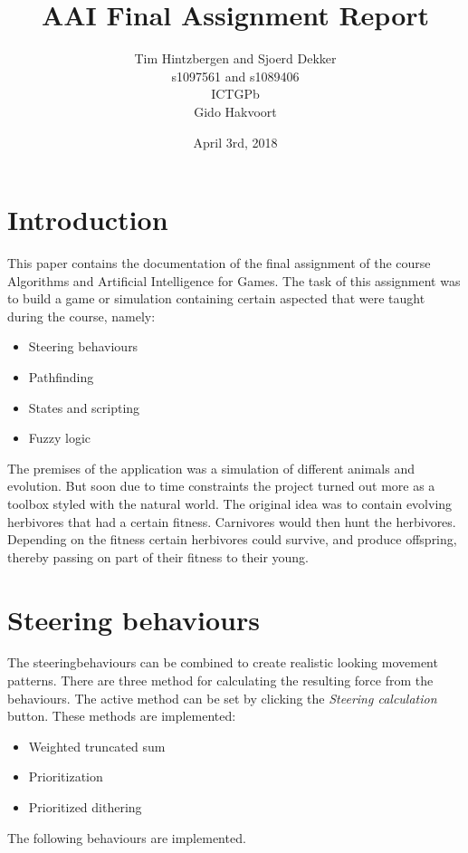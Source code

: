 \documentclass[10pt]{extarticle} %
\title{\huge AAI Final Assignment Report}
\author{Tim Hintzbergen and Sjoerd Dekker	\\s1097561 and s1089406
								\\ICTGPb
								\\Gido Hakvoort}
\date{April 3rd, 2018}
\begin{document}
   \maketitle
   \thispagestyle{empty}
   \newpage
   \newpage
   \setcounter{page}{1}
   \section {Introduction}
   This paper contains the documentation of the final assignment of the course Algorithms and Artificial Intelligence for Games. The task of this assignment was to build a game or simulation containing certain aspected that were taught during the course, namely:
   \begin{itemize}
      \item Steering behaviours
      \item Pathfinding
      \item States and scripting
      \item Fuzzy logic
   \end{itemize}
   The premises of the application was a simulation of different animals and evolution. But soon due to time constraints the project turned out more as a toolbox styled with the natural world. The original idea was to contain evolving herbivores that had a certain fitness. Carnivores would then hunt the herbivores. Depending on the fitness certain herbivores could survive, and produce offspring, thereby passing on part of their fitness to their young.
   \newpage

   \tableofcontents{}
   \newpage
   \section{Steering behaviours}
   The steeringbehaviours can be combined to create realistic looking movement patterns. There are three method for calculating the resulting force from the behaviours. The active method can be set by clicking the \emph{Steering calculation} button. These methods are implemented:
   \begin{itemize}
   \item Weighted truncated sum
   \item Prioritization
   \item Prioritized dithering
   \end{itemize}
   The following behaviours are implemented.
\end{document}

